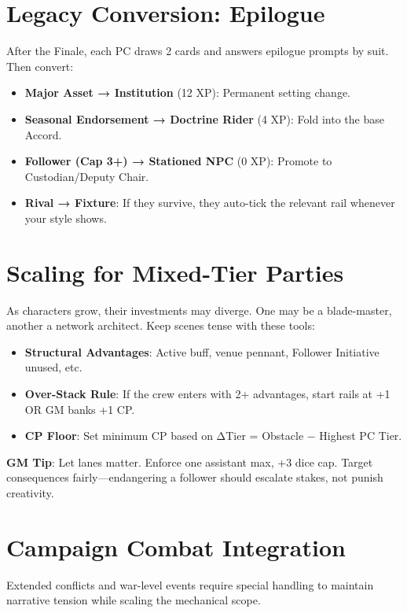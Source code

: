 \section*{Legacy Conversion: Epilogue}

After the Finale, each PC draws 2 cards and answers epilogue prompts by suit. Then convert:

\begin{itemize}
    \item \textbf{Major Asset → Institution} (12 XP): Permanent setting change.
    \item \textbf{Seasonal Endorsement → Doctrine Rider} (4 XP): Fold into the base Accord.
    \item \textbf{Follower (Cap 3+) → Stationed NPC} (0 XP): Promote to Custodian/Deputy Chair.
    \item \textbf{Rival → Fixture}: If they survive, they auto-tick the relevant rail whenever your style shows.
\end{itemize}

\section*{Scaling for Mixed-Tier Parties}

As characters grow, their investments may diverge. One may be a blade-master, another a network architect. Keep scenes tense with these tools:

\begin{itemize}
    \item \textbf{Structural Advantages}: Active buff, venue pennant, Follower Initiative unused, etc.
    \item \textbf{Over-Stack Rule}: If the crew enters with 2+ advantages, start rails at +1 OR GM banks +1 CP.
    \item \textbf{CP Floor}: Set minimum CP based on ΔTier = Obstacle − Highest PC Tier.
\end{itemize}

\textbf{GM Tip}: Let lanes matter. Enforce one assistant max, +3 dice cap. Target consequences fairly—endangering a follower should escalate stakes, not punish creativity.

\section*{Campaign Combat Integration}

Extended conflicts and war-level events require special handling to maintain narrative tension while scaling the mechanical scope.

